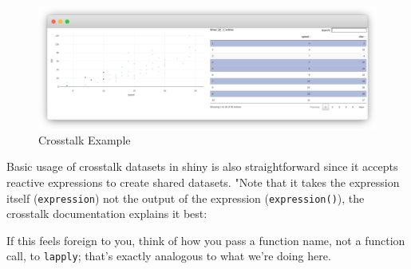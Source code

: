 \documentclass[
]{krantz}
\renewenvironment{quote}{\begin{VF}}{\end{VF}}
\begin{document}
\begin{figure}
\centering
\includegraphics{images/crosstalk.png}
\caption{Crosstalk Example}
\end{figure}

Basic usage of crosstalk datasets in shiny is also straightforward since it accepts reactive expressions to create shared datasets. "Note that it takes the expression itself (\texttt{expression}) not the output of the expression (\texttt{expression()}), the crosstalk documentation explains it best:

\begin{quote}
If this feels foreign to you, think of how you pass a function name, not a function call, to \texttt{lapply}; that's exactly analogous to what we're doing here.

\end{quote}
\end{document}
